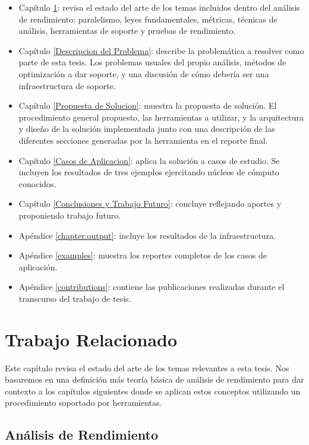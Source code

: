 \documentclass[a4paper]{report}
\begin{document}
\begin{itemize}
\item Capítulo \ref{Trabajo Relacionado}: revisa el estado del arte de los temas incluidos dentro del análisis de rendimiento: paralelismo, leyes fundamentales, métricas, técnicas de análisis,
herramientas de soporte y pruebas de rendimiento.
\item Capítulo \ref{Descripcion del Problema}: describe la problemática a resolver como parte de esta tesis. Los problemas usuales del propio análisis, métodos de optimización a dar soporte, y una discusión de cómo debería ser una infraestructura de soporte.
\item Capítulo \ref{Propuesta de Solucion}: muestra la propuesta de solución. El procedimiento general propuesto, las herramientas a utilizar, y la arquitectura y diseño de la solución implementada junto con una descripción de las diferentes secciones generadas por la herramienta en el reporte final.
\item Capítulo \ref{Casos de Aplicacion}: aplica la solución a casos de estudio. Se incluyen los resultados de tres ejemplos ejercitando núcleos de cómputo conocidos.
\item Capítulo \ref{Conclusiones y Trabajo Futuro}: concluye reflejando aportes y proponiendo trabajo futuro. 
\item Apéndice \ref{chapter:output}: incluye los resultados de la infraestructura.
\item Apéndice \ref{examples}: muestra los reportes completos de los casos de aplicación.
\item Apéndice \ref{contributions}: contiene las publicaciones realizadas durante el transcurso del trabajo de tesis.

\end{itemize}

\chapter{Trabajo Relacionado} \label{Trabajo Relacionado}

Este capítulo revisa el estado del arte de los temas relevantes a esta tesis. Nos basaremos en una definición más teoría básica de análisis de rendimiento para dar contexto a los capítulos siguientes donde se aplican estos conceptos utilizando un procedimiento soportado por herramientas.

\section{Análisis de Rendimiento}\label{chapter:analysis}
\end{document}

